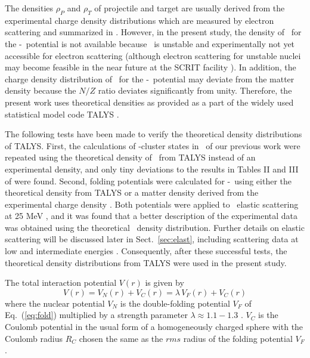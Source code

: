 The densities $\rho_P$ and $\rho_T$ of projectile and target are usually
derived from the experimental charge density distributions which are measured
by electron scattering and summarized in \cite{Vri87}. However, in the
present study, the density of \tiii\ for the \tiii -\al\ potential is not
available because \tiii\ is unstable and experimentally not yet accessible for
electron scattering (although electron scattering for unstable nuclei may
become feasible in the near future at the SCRIT facility \cite{Tsu17}). In
addition, the charge density distribution of \tinull\ for the \tinull
-\al\ potential may deviate from the matter density because the $N/Z$ ratio
deviates significantly from unity. Therefore, the present work uses
theoretical densities as provided as a part of the widely used statistical
model code TALYS \cite{TALYS}.

The following tests have been made to verify the theoretical density
distributions of TALYS. First, the calculations of \al -cluster states in
\tiiv\ of our previous work \cite{Atz96} were repeated using the theoretical
density of \canull\ from TALYS instead of an experimental density, and only
tiny deviations to the results in Tables II and III of \cite{Atz96} were
found. Second, folding potentials were calculated for \tinull -\al\ using
either the theoretical density from TALYS or a matter density derived from the
experimental charge density \cite{Vri87}. Both potentials were applied to
\tinull \raa \tinull\ elastic scattering at 25 MeV \cite{Gub81}, and it was
found that a better description of the experimental data was obtained using
the theoretical \tinull\ density distribution. Further details on elastic
scattering will be discussed later in Sect.~\ref{sec:elast}, including
scattering data at low and intermediate energies
\cite{Rob78,Pesl83}. Consequently, after these successful tests, the
theoretical density distributions from TALYS were used in the present study.

The total interaction potential $V(r)$ is given by 
%
\begin{equation}
V(r) = V_N(r) + V_C(r) = \lambda \, V_F(r) + V_C(r)
\label{eq:vtot}
\end{equation}
%
where the nuclear potential $V_N$ is the double-folding potential $V_F$ of
Eq.~(\ref{eq:fold}) multiplied by a strength parameter $\lambda \approx 1.1 -
1.3$ \cite{Atz96,Mohr13}. $V_C$ is the Coulomb potential in the usual form of
a homogeneously charged sphere with the Coulomb radius $R_C$ chosen the same
as the $rms$ radius of the folding potential $V_F$.

